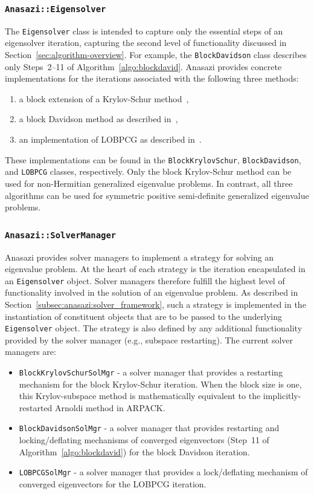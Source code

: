 \documentclass[acmtoms,acmnow]{acmtrans2m}
\newcommand{\aspace}[1]{\texttt{#1}}
\begin{document}
\subsubsection{\aspace{Anasazi::Eigensolver}}

The \aspace{Eigensolver} class is intended to capture only the essential steps of an
eigensolver iteration, capturing the second level of functionality discussed in
Section~\ref{sec:algorithm-overview}. For example, the \aspace{BlockDavidson} class
describes only Steps~2--11 of Algorithm~\ref{algo:blockdavid}.  Anasazi provides concrete
implementations for the iterations associated with the following three methods:
\begin{enumerate}
  \item a block extension of a Krylov-Schur method~\cite{stew:01},
  \item a block Davidson method as described in~\cite{Arbenz:2005:ACE},
  \item an implementation of LOBPCG as described in~\cite{Hetmaniuk:2006:BSL}.
\end{enumerate}
These implementations can be found in the \aspace{BlockKrylovSchur},
\aspace{BlockDavidson}, and \aspace{LOBPCG} classes, respectively. Only the block
Krylov-Schur method can be used for non-Hermitian generalized eigenvalue problems. In
contrast, all three algorithms can be used for symmetric positive semi-definite
generalized eigenvalue problems. 


\subsubsection{\aspace{Anasazi::SolverManager}}

Anasazi provides solver managers to implement a strategy for solving an eigenvalue
problem. At the heart of each strategy is the iteration encapsulated in an
\aspace{Eigensolver} object. Solver managers therefore fulfill the highest level of
functionality involved in the solution of an eigenvalue problem. As described in
Section~\ref{subsec:anasazi:solver_framework}, such a strategy is implemented in the
instantiation of constituent objects that are to be passed to the underlying
\aspace{Eigensolver} object. The strategy is also defined by any additional
functionality provided by the solver manager (e.g., subspace restarting). The current
solver managers are:
\begin{itemize}
  \item \aspace{BlockKrylovSchurSolMgr} - a solver manager 
    that provides a restarting mechanism for the block Krylov-Schur iteration.
  When the block size is one, this Krylov-subspace method is mathematically equivalent to the
  implicitly-restarted Arnoldi method in ARPACK. 
  \item \aspace{BlockDavidsonSolMgr} - a solver manager that provides restarting and locking/deflating
    mechanisms of converged eigenvectors (Step~11 of Algorithm~\ref{algo:blockdavid})
    for the block Davidson iteration.
  \item \aspace{LOBPCGSolMgr} - a solver manager 
    that provides a lock/deflating mechanism of converged eigenvectors for the LOBPCG
    iteration.
\end{itemize}
\end{document}
